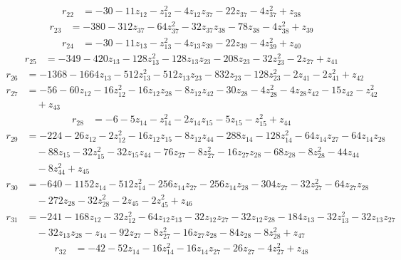 \begin{align*}
r_{22} &=-30-11z_{12}-z_{12}^{2}-4z_{12}z_{37}-22z_{37}-4z_{37}^{2}+z_{38}
\end{align*}
\begin{align*}
r_{23} &=-380-312z_{37}-64z_{37}^{2}-32z_{37}z_{38}-78z_{38}-4z_{38}^{2}+z_{39}
\end{align*}
\begin{align*}
r_{24} &=-30-11z_{13}-z_{13}^{2}-4z_{13}z_{39}-22z_{39}-4z_{39}^{2}+z_{40}
\end{align*}
\begin{align*}
r_{25} &=-349-420z_{13}-128z_{13}^{2}-128z_{13}z_{23}-208z_{23}-32z_{23}^{2}-2z_{27}+z_{41}
\end{align*}
\begin{align*}
r_{26} &=-1368-1664z_{13}-512z_{13}^{2}-512z_{13}z_{23}-832z_{23}-128z_{23}^{2}-2z_{41}-2z_{41}^{2}+z_{42}
\end{align*}
\begin{align*}
r_{27} &=-56-60z_{12}-16z_{12}^{2}-16z_{12}z_{28}-8z_{12}z_{42}-30z_{28}-4z_{28}^{2}-4z_{28}z_{42}-15z_{42}-z_{42}^{2}\\
&\quad +z_{43}
\end{align*}
\begin{align*}
r_{28} &=-6-5z_{14}-z_{14}^{2}-2z_{14}z_{15}-5z_{15}-z_{15}^{2}+z_{44}
\end{align*}
\begin{align*}
r_{29} &=-224-26z_{12}-2z_{12}^{2}-16z_{12}z_{15}-8z_{12}z_{44}-288z_{14}-128z_{14}^{2}-64z_{14}z_{27}-64z_{14}z_{28}\\
&\quad -88z_{15}-32z_{15}^{2}-32z_{15}z_{44}-76z_{27}-8z_{27}^{2}-16z_{27}z_{28}-68z_{28}-8z_{28}^{2}-44z_{44}\\
&\quad -8z_{44}^{2}+z_{45}
\end{align*}
\begin{align*}
r_{30} &=-640-1152z_{14}-512z_{14}^{2}-256z_{14}z_{27}-256z_{14}z_{28}-304z_{27}-32z_{27}^{2}-64z_{27}z_{28}\\
&\quad -272z_{28}-32z_{28}^{2}-2z_{45}-2z_{45}^{2}+z_{46}
\end{align*}
\begin{align*}
r_{31} &=-241-168z_{12}-32z_{12}^{2}-64z_{12}z_{13}-32z_{12}z_{27}-32z_{12}z_{28}-184z_{13}-32z_{13}^{2}-32z_{13}z_{27}\\
&\quad -32z_{13}z_{28}-z_{14}-92z_{27}-8z_{27}^{2}-16z_{27}z_{28}-84z_{28}-8z_{28}^{2}+z_{47}
\end{align*}
\begin{align*}
r_{32} &=-42-52z_{14}-16z_{14}^{2}-16z_{14}z_{27}-26z_{27}-4z_{27}^{2}+z_{48}
\end{align*}

